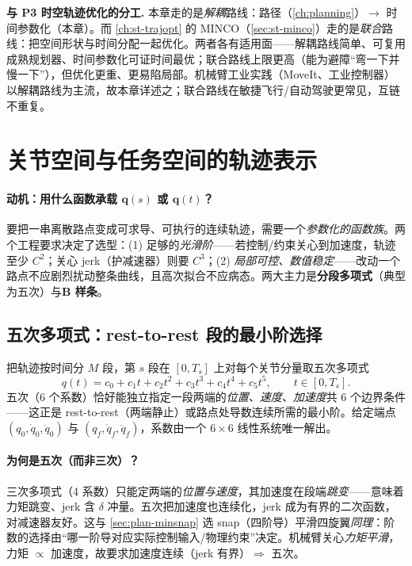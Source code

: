 \begin{note}
\textbf{与 P3 时空轨迹优化的分工.}\;
本章走的是\emph{解耦}路线：路径（\cref{ch:planning}）$\to$ 时间参数化（本章）。而 \cref{ch:st-trajopt} 的 MINCO（\cref{sec:st-minco}）走的是\emph{联合}路线：把空间形状与时间分配一起优化。两者各有适用面——解耦路线简单、可复用成熟规划器、时间参数化可证时间最优；联合路线上限更高（能为避障“弯一下并慢一下”），但优化更重、更易陷局部。机械臂工业实践（MoveIt、工业控制器）以解耦路线为主流，故本章详述之；联合路线在敏捷飞行/自动驾驶更常见，互链不重复。
\end{note}

\section{关节空间与任务空间的轨迹表示}
\label{sec:at-repr}

\paragraph{动机：用什么函数承载 $\mathbf{q}(s)$ 或 $\mathbf{q}(t)$？}
要把一串离散路点变成可求导、可执行的连续轨迹，需要一个\emph{参数化的函数族}。两个工程要求决定了选型：(1) 足够的\emph{光滑阶}——若控制/约束关心到加速度，轨迹至少 $C^2$；关心 jerk（护减速器）则要 $C^3$；(2) \emph{局部可控、数值稳定}——改动一个路点不应剧烈扰动整条曲线，且高次拟合不应病态。两大主力是\textbf{分段多项式}（典型为五次）与\textbf{B 样条}。

\subsection{五次多项式：rest-to-rest 段的最小阶选择}
\label{subsec:at-quintic}

\begin{definition}[分段五次多项式轨迹]\label{def:at-quintic}
把轨迹按时间分 $M$ 段，第 $s$ 段在 $[0,T_s]$ 上对每个关节分量取五次多项式
\begin{equation}
  q(t)=c_0+c_1 t+c_2 t^2+c_3 t^3+c_4 t^4+c_5 t^5,\qquad t\in[0,T_s].
  \label{eq:at-quintic}
\end{equation}
五次（$6$ 个系数）恰好能独立指定一段两端的\emph{位置、速度、加速度}共 $6$ 个边界条件——这正是 rest-to-rest（两端静止）或路点处导数连续所需的最小阶。给定端点 $(q_0,\dot q_0,\ddot q_0)$ 与 $(q_f,\dot q_f,\ddot q_f)$，系数由一个 $6\times 6$ 线性系统唯一解出。
\end{definition}

\paragraph{为何是五次（而非三次）？}
三次多项式（$4$ 系数）只能定两端的\emph{位置与速度}，其加速度在段端\emph{跳变}——意味着力矩跳变、jerk 含 $\delta$ 冲量。五次把加速度也连续化，jerk 成为有界的二次函数，对减速器友好。这与 \cref{sec:plan-minsnap} 选 snap（四阶导）平滑四旋翼\emph{同理}：阶数的选择由“哪一阶导对应实际控制输入/物理约束”决定。机械臂关心\emph{力矩平滑}，力矩 $\propto$ 加速度，故要求加速度连续（jerk 有界）$\Rightarrow$ 五次。

